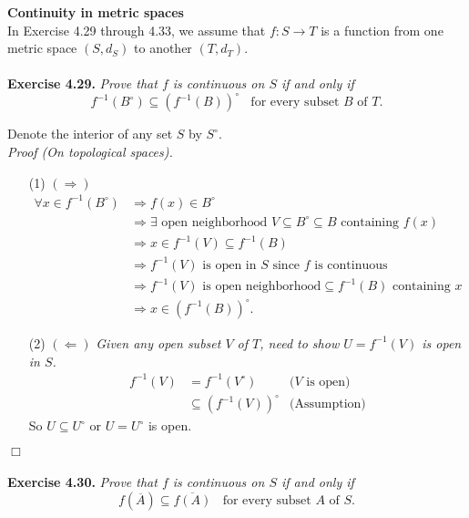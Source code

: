 \documentclass{article}
\begin{document}
\textbf{\large Continuity in metric spaces} \\

In Exercise 4.29 through 4.33, we assume that $f: S \rightarrow T$ is a function
from one metric space $(S, d_S)$ to another $(T, d_T)$. \\\\



\textbf{Exercise 4.29.}
\emph{Prove that $f$ is continuous on $S$ if and only if
$$f^{-1}(B^{\circ}) \subseteq (f^{-1}(B))^{\circ}
\:\:\:\: \text{for every subset $B$ of $T$}.$$}

Denote the interior of any set $S$ by $S^{\circ}$. \\

\emph{Proof (On topological spaces).}
\begin{enumerate}
\item[(1)]
$(\Longrightarrow)$
\begin{align*}
\forall x \in f^{-1}(B^{\circ})
&\Longrightarrow
f(x) \in B^{\circ} \\
&\Longrightarrow
\exists \text{ open neighborhood } V \subseteq B^{\circ} \subseteq B \text{ containing } f(x) \\
&\Longrightarrow
x \in f^{-1}(V) \subseteq f^{-1}(B) \\
&\Longrightarrow
f^{-1}(V) \text{ is open in $S$ since $f$ is continuous} \\
&\Longrightarrow
f^{-1}(V)\text{ is open neighborhood} \subseteq f^{-1}(B) \text{ containing } x \\
&\Longrightarrow
x \in (f^{-1}(B))^{\circ}.
\end{align*}
\item[(2)]
$(\Longleftarrow)$
\emph{Given any open subset $V$ of $T$, need to show
$U = f^{-1}(V)$ is open in $S$.}
\begin{align*}
f^{-1}(V)
&= f^{-1}(V^{\circ})
  &\text{($V$ is open)} \\
&\subseteq (f^{-1}(V))^{\circ}
  &\text{(Assumption)}
\end{align*}
So $U \subseteq U^{\circ}$ or $U = U^{\circ}$ is open.
\end{enumerate}
$\Box$ \\\\



\textbf{Exercise 4.30.}
\emph{Prove that $f$ is continuous on $S$ if and only if
$$f(\overline{A}) \subseteq \overline{f(A)}
\:\:\:\: \text{for every subset $A$ of $S$}.$$}
\end{document}
